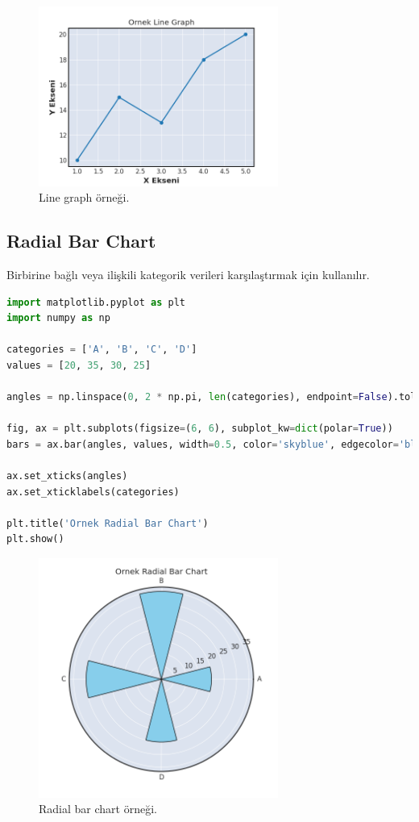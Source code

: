 \begin{figure}[h]
    \centering
    \includegraphics[width=0.7\textwidth]{images/line_graph.png}
    \caption{Line graph örneği.}
    \label{fig:enter-label}
\end{figure}

\newpage

\subsection{Radial Bar Chart}
Birbirine bağlı veya ilişkili kategorik verileri karşılaştırmak için kullanılır.

\begin{lstlisting}[language=Python]
import matplotlib.pyplot as plt
import numpy as np

categories = ['A', 'B', 'C', 'D']
values = [20, 35, 30, 25]

angles = np.linspace(0, 2 * np.pi, len(categories), endpoint=False).tolist()

fig, ax = plt.subplots(figsize=(6, 6), subplot_kw=dict(polar=True))
bars = ax.bar(angles, values, width=0.5, color='skyblue', edgecolor='black')

ax.set_xticks(angles)
ax.set_xticklabels(categories)

plt.title('Ornek Radial Bar Chart')
plt.show()
\end{lstlisting}

\begin{figure}[h]
    \centering
    \includegraphics[width=0.7\textwidth]{images/radial_bar_chart.png}
    \caption{Radial bar chart örneği.}
    \label{fig:enter-label}
\end{figure}

